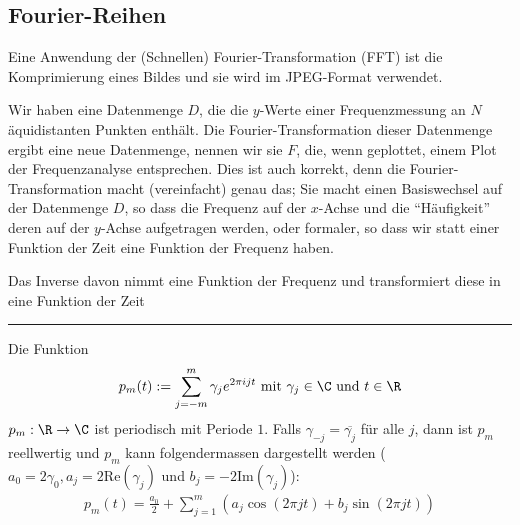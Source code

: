 
%
\subsection{Fourier-Reihen}
Eine Anwendung der (Schnellen) Fourier-Transformation (FFT) ist die Komprimierung eines Bildes und sie wird im JPEG-Format verwendet.

\inlineintuition Wir haben eine Datenmenge $D$, die die $y$-Werte einer Frequenzmessung an $N$ äquidistanten Punkten enthält.
Die Fourier-Transformation dieser Datenmenge ergibt eine neue Datenmenge, nennen wir sie $F$, die, wenn geplottet, einem Plot der Frequenzanalyse entsprechen.
Dies ist auch korrekt, denn die Fourier-Transformation macht (vereinfacht) genau das;
Sie macht einen Basiswechsel auf der Datenmenge $D$, so dass die Frequenz auf der $x$-Achse und die ``Häufigkeit'' deren auf der $y$-Achse aufgetragen werden,
oder formaler, so dass wir statt einer Funktion der Zeit eine Funktion der Frequenz haben.

Das Inverse davon nimmt eine Funktion der Frequenz und transformiert diese in eine Funktion der Zeit

\vspace{0.3cm}
\hrule
\vspace{0.2cm}

 Die Funktion
\rmvspace
\begin{align*}
    p_m(t) := \sum_{j = -m}^{m} \gamma_j e^{2 \pi ijt} \text{ mit } \gamma_j \in \C \text{ und } t \in \R
\end{align*}
%
%
\inlineremark $p_m : \R \rightarrow \C$ ist periodisch mit Periode $1$.
Falls $\gamma_{-j} = \overline{\gamma_j}$ für alle $j$, dann ist $p_m$ reellwertig und
$p_m$ kann folgendermassen dargestellt werden ($a_0 = 2\gamma_0, a_j = 2\text{Re}(\gamma_j)$ und $b_j = -2\text{Im}(\gamma_j)$):
\rmvspace
\begin{align*}
    p_m(t) = \frac{a_0}{2} + \sum_{j = 1}^{m} (a_j \cos(2\pi jt) + b_j \sin(2\pi jt))
\end{align*}

